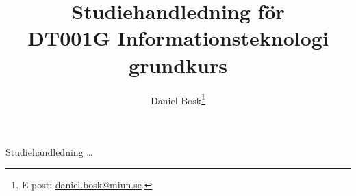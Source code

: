 \documentclass[a4paper,logo]{miunart}
\title{Studiehandledning för\\DT001G Informationsteknologi grundkurs}
\author{Daniel Bosk\footnote{%
	E-post: \href{mailto:daniel.bosk@miun.se}{daniel.bosk@miun.se}.
}}
\date{\svnId}
\begin{document}
\maketitle
\noindent
Studiehandledning \dots



\end{document}
